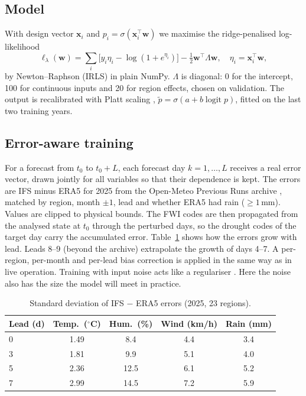\documentclass[conference,a4paper]{IEEEtran}
\newcommand{\logit}{\operatorname{logit}}
\begin{document}
\subsection{Model}
With design vector $\mathbf x_i$ and $p_i = \sigma(\mathbf x_i^\top \mathbf w)$ we maximise the ridge-penalised
log-likelihood \cite{lecessie1992}
\begin{equation}
\ell_\lambda(\mathbf w) = \sum_i \big[y_i \eta_i - \log(1 + e^{\eta_i})\big] - \tfrac12 \mathbf w^\top \Lambda \mathbf w,
\quad \eta_i = \mathbf x_i^\top \mathbf w,
\end{equation}
by Newton--Raphson (IRLS) in plain NumPy. $\Lambda$ is diagonal: 0 for the intercept, 100 for continuous inputs and 20
for region effects, chosen on validation. The output is recalibrated with Platt scaling
\cite{platt1999,niculescu2005}, $\tilde p = \sigma(a + b \logit p)$, fitted on the last two training years.

\subsection{Error-aware training}
For a forecast from $t_0$ to $t_0+L$, each forecast day $k = 1,\dots,L$ receives a real error vector, drawn jointly for
all variables so that their dependence is kept. The errors are IFS minus ERA5 for 2025 from the Open-Meteo Previous
Runs archive \cite{openmeteo}, matched by region, month $\pm 1$, lead and whether ERA5 had rain ($\geq 1$\,mm). Values
are clipped to physical bounds. The FWI codes are then propagated from the analysed state at $t_0$ through the perturbed
days, so the drought codes of the target day carry the accumulated error. Table~\ref{tab:errors} shows how the errors
grow with lead. Leads 8--9 (beyond the archive) extrapolate the growth of days 4--7. A per-region, per-month and
per-lead bias correction is applied in the same way as in live operation. Training with input noise acts like a
regulariser \cite{bishop1995}. Here the noise also has the size the model will meet in practice.

\begin{table}[t]
\centering
\caption{Standard deviation of IFS $-$ ERA5 errors (2025, 23 regions).}
\label{tab:errors}
\footnotesize
\begin{tabular}{@{}lcccc@{}}
\toprule
Lead (d) & Temp.\ ($^\circ$C) & Hum.\ (\%) & Wind (km/h) & Rain (mm) \\
\midrule
0 & 1.49 & 8.4 & 4.4 & 3.4 \\
3 & 1.81 & 9.9 & 5.1 & 4.0 \\
5 & 2.36 & 12.5 & 6.1 & 5.2 \\
7 & 2.99 & 14.5 & 7.2 & 5.9 \\
\bottomrule
\end{tabular}
\end{table}
\end{document}
